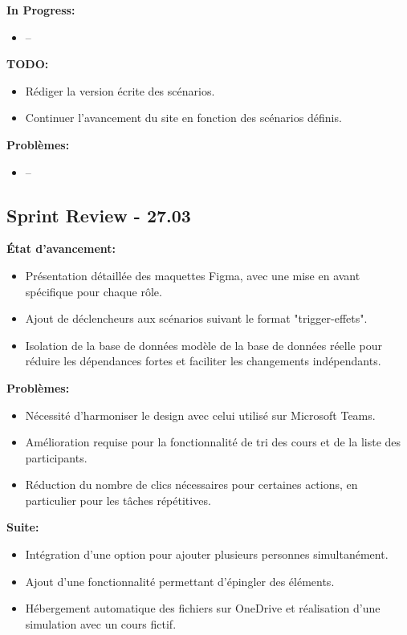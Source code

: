 \documentclass[11pt]{article}
\begin{document}
\textbf{In Progress:}
\begin{itemize}
  \item -- 
\end{itemize}

\textbf{TODO:}
\begin{itemize}
  \item Rédiger la version écrite des scénarios.
  \item Continuer l'avancement du site en fonction des scénarios définis.
\end{itemize}

\textbf{Problèmes:}
\begin{itemize}
  \item -- 
\end{itemize}







\subsection*{{\color{navy}Sprint Review - 27.03}}

\textbf{État d'avancement:}
\begin{itemize}
  \item Présentation détaillée des maquettes Figma, avec une mise en avant spécifique pour chaque rôle.
  \item Ajout de déclencheurs aux scénarios suivant le format "trigger-effets".
  \item Isolation de la base de données modèle de la base de données réelle pour réduire les dépendances fortes et faciliter les changements indépendants.
\end{itemize}

\textbf{Problèmes:}
\begin{itemize}
  \item Nécessité d'harmoniser le design avec celui utilisé sur Microsoft Teams.
  \item Amélioration requise pour la fonctionnalité de tri des cours et de la liste des participants.
  \item Réduction du nombre de clics nécessaires pour certaines actions, en particulier pour les tâches répétitives.
\end{itemize}

\textbf{Suite:}
\begin{itemize}
  \item Intégration d'une option pour ajouter plusieurs personnes simultanément.
  \item Ajout d'une fonctionnalité permettant d'épingler des éléments.
  \item Hébergement automatique des fichiers sur OneDrive et réalisation d'une simulation avec un cours fictif.
\end{itemize}
\end{document}

